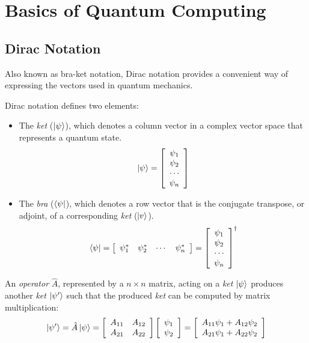%
%
\chapter {Basics of Quantum Computing}

\section{Dirac Notation}

Also known as bra-ket notation, Dirac notation provides a convenient way of expressing the vectors used in quantum mechanics.

Dirac notation defines two elements:

\begin{itemize}
    \item The \textit{ket} ($\left|{\psi}\right\rangle$), which denotes a column vector in a complex vector space that represents a quantum state.
    $$\left|{\psi}\right\rangle=\left[\begin{array}{c}\psi_{1} \\ \psi_{2} \\ \cdots \\ \psi_{n} \end{array}\right]$$
    \item The \textit{bra} ($\left\langle{\psi}\right|$), which denotes a row vector that is the conjugate transpose, or adjoint, of a corresponding \textit{ket} ($\left|{v}\right\rangle$).
    $$\left\langle{\psi}\right|=\left[\begin{array}{cccc}\psi_{1}^{*} & \psi_{2}^{*} & \cdots & \psi_{n}^{*}\end{array}\right]=\left[\begin{array}{c}\psi_{1} \\ \psi_{2} \\ \cdots \\ \psi_{n} \end{array}\right]^{\dagger}$$
\end{itemize}

An \textit{operator} $\hat{A}$, represented by a $n \times n$ matrix, acting on a \textit{ket} $\left|{\psi}\right\rangle$ produces another \textit{ket} $\left|{\psi'}\right\rangle$ such that the produced \textit{ket} can be computed by matrix multiplication:
$$\left|{\psi'}\right\rangle=\hat{A}\left|{\psi}\right\rangle=\left[\begin{array}{cc}A_{11} & A_{12} \\ A_{21} & A_{22}\end{array}\right]\left[\begin{array}{c}\psi_{1} \\ \psi_{2}\end{array}\right]=\left[\begin{array}{c}A_{11}\psi_{1}+A_{12}\psi_{2} \\ A_{21}\psi_{1}+A_{22}\psi_{2}\end{array}\right]$$

